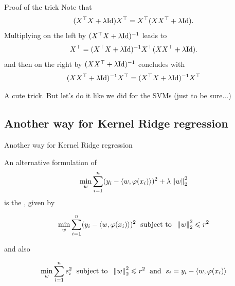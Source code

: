 \documentclass[xcolor={usenames,dvipsnames}]{beamer}
\begin{document}
%
  \begin{frame}{Proof of the trick}   
  Note that
  \begin{equation*}
      (X^\top X + \lambda \mathrm{Id}) X^\top = X^\top (X X^\top + \lambda \mathrm{Id}).
  \end{equation*}
  Multiplying on the left by $(X^\top X + \lambda \mathrm{Id})^{-1}$ leads to
  \begin{equation*}
      X^\top = (X^\top X + \lambda \mathrm{Id})^{-1} X^\top (X X^\top + \lambda \mathrm{Id}).
  \end{equation*}
  and then on the right by  $(X X^\top + \lambda \mathrm{Id})^{-1}$ concludes with
  \begin{equation*}
      (X X^\top + \lambda \mathrm{Id})^{-1} X^\top = (X^\top X + \lambda \mathrm{Id})^{-1}
       X^\top 
  \end{equation*}
  
  
  \vspace{1cm}
   A cute trick. But let's do it like we did for the SVMs  (just to be sure...)
  \end{frame}

\subsection{Another way for Kernel Ridge regression}

\begin{frame}{Another way for Kernel Ridge regression}

  An alternative formulation of
  \begin{equation*}
  \min_{w}  \sum_{i=1}^n (y_i - \langle w, \varphi(x_i) \rangle)^2 + \lambda
  \left\| w \right\|_2^2 
  \end{equation*}
  is the \textbf{}, given by
  \begin{block}{}
  \begin{equation*}
  \min_{w} \sum_{i=1}^n (y_i - \langle w, \varphi(x_i) \rangle)^2 \; \text{ subject to } \; 
  \left\| w \right\|_2^2 \leqslant r^2
  \end{equation*}
  \end{block}
  and also
    \begin{block}{}
  \begin{equation*}
  \min_{w} \sum_{i=1}^n s_i^2 \; \text{ subject to } \; 
  \left\| w \right\|_2^2 \leqslant r^2 \; \text{ and } \; s_i = y_i - \langle w, \varphi(x_i) \rangle
  \end{equation*}
    \end{block}
    
    \end{frame}
  
\end{document}
